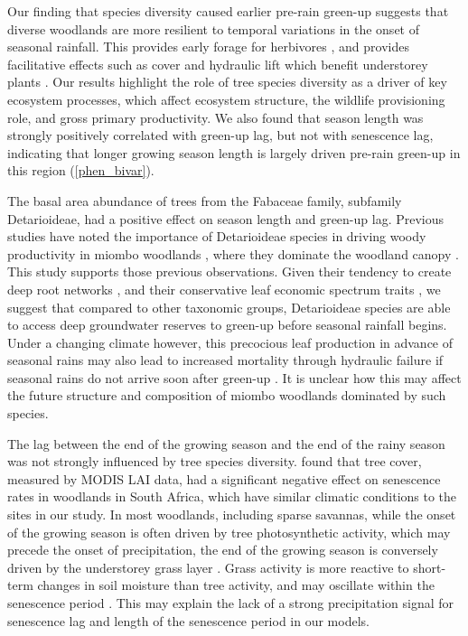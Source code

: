 \documentclass[11pt,a4paper]{article}
\begin{document}
Our finding that species diversity caused earlier pre-rain green-up suggests that diverse woodlands are more resilient to temporal variations in the onset of seasonal rainfall. This provides early forage for herbivores \citep{Morellato2016}, and provides facilitative effects such as cover and hydraulic lift which benefit understorey plants \citep{Domec2010, Yu2015}. Our results highlight the role of tree species diversity as a driver of key ecosystem processes, which affect ecosystem structure, the wildlife provisioning role, and gross primary productivity. We also found that season length was strongly positively correlated with green-up lag, but not with senescence lag, indicating that longer growing season length is largely driven pre-rain green-up in this region (\autoref{phen_bivar}).

The basal area abundance of trees from the Fabaceae family, subfamily Detarioideae, had a positive effect on season length and green-up lag. Previous studies have noted the importance of Detarioideae species in driving woody productivity in miombo woodlands \citep{Ryan2017}, where they dominate the woodland canopy \citep{Godlee2021, Chidumayo2001}. This study supports those previous observations. Given their tendency to create deep root networks \citep{Zhou2020}, and their conservative leaf economic spectrum traits \citep{Wigley2016}, we suggest that compared to other taxonomic groups, Detarioideae species are able to access deep groundwater reserves to green-up before seasonal rainfall begins. Under a changing climate however, this precocious leaf production in advance of seasonal rains may also lead to increased mortality through hydraulic failure if seasonal rains do not arrive soon after green-up \citep{Vinya2018}. It is unclear how this may affect the future structure and composition of miombo woodlands dominated by such species.

The lag between the end of the growing season and the end of the rainy season was not strongly influenced by tree species diversity. \citet{Cho2017} found that tree cover, measured by MODIS LAI data, had a significant negative effect on senescence rates in woodlands in South Africa, which have similar climatic conditions to the sites in our study. In most woodlands, including sparse savannas, while the onset of the growing season is often driven by tree photosynthetic activity, which may precede the onset of precipitation, the end of the growing season is conversely driven by the understorey grass layer \citep{Cho2017, Guan2014}. Grass activity is more reactive to short-term changes in soil moisture than tree activity, and may oscillate within the senescence period \citep{Archibald2007}. This may explain the lack of a strong precipitation signal for senescence lag and length of the senescence period in our models.
\end{document}

